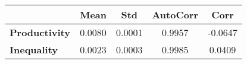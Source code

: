 \begin{tiny}\begin{tabular}{|l|c|c|c|c|}
\hline
&\textbf{Mean}&\textbf{Std}&\textbf{AutoCorr}&\textbf{Corr}\\\hline
\textbf{Productivity}&0.0080&0.0001&0.9957&-0.0647\\\hline
\textbf{Inequality}&0.0023&0.0003&0.9985&0.0409\\\hline
\end{tabular}
\end{tiny}